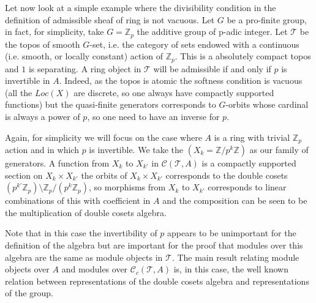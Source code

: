 \documentclass[a4paper]{article}
\newcommand{\Z}{\mathbb{Z}}
\newcommand{\Tcal}{\mathcal{T}}
\newcommand{\Ccal}{\mathcal{C}}
\newcommand{\block}[1]
{

\par \subsubsection{} #1

\bigskip}
\begin{document}
\block{Let now look at a simple example where the divisibility condition in the definition of admissible sheaf of ring is not vacuous. Let $G$ be a pro-finite group, in fact, for simplicity, take $G = \Z_p$ the additive group of p-adic integer.
Let $\Tcal$ be the topos of smooth $G$-set, i.e. the category of sets endowed with a continuous (i.e. smooth, or locally constant) action of $\mathbb{Z}_p$. This is a absolutely compact topos and $1$ is separating. A ring object in $\Tcal$ will be admissible if and only if $p$ is invertible in $A$. Indeed, as the topos is atomic the softness condition is vacuous (all the $Loc(X)$ are discrete, so one always have compactly supported functions) but the quasi-finite generators corresponds to $G$-orbits whose cardinal is always a power of $p$, so one need to have an inverse for $p$. 

Again, for simplicity we will focus on the case where $A$ is a ring with trivial $\mathbb{Z}_p$ action and in which $p$ is invertible. We take the $(X_k = \mathbb{Z}/p^k \Z)$ as our family of generators. A function from $X_k$ to $X_{k'}$ in $\Ccal(\Tcal,A)$ is a compactly supported section on $X_k \times X_{k'}$ the orbits of $X_k \times X_{k'}$ corresponds to the double cosets $(p^{k'}\Z_{p}) \setminus \Z_p /(p^k \Z_{p})$, so morphisms from $X_k$ to $X_{k'}$ corresponds to linear combinations of this with coefficient in $A$ and the composition can be seen to be the multiplication of double cosets algebra.

Note that in this case the invertibility of $p$ appears to be unimportant for the definition of the algebra but are important for the proof that modules over this algebra are the same as module objects in $\Tcal$. The main result relating module objects over $A$ and modules over $\Ccal_c(\Tcal,A)$ is, in this case, the well known relation between representations of the double cosets algebra and representations of the group.
}
\end{document}
